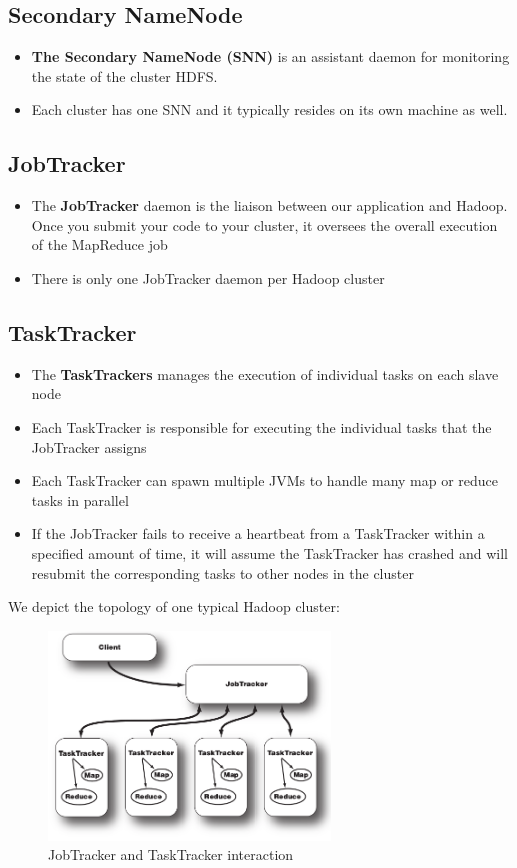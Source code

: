 \documentclass{article}
\begin{document}
\begin{multicols}{2}
\subsection {Secondary NameNode}
\begin{itemize}
\item \textbf{The Secondary NameNode (SNN)} is an assistant daemon for monitoring the state of the cluster HDFS. 
\item Each cluster has one SNN and it typically resides on its own machine as well.
\end{itemize}

\subsection {JobTracker}
\begin{itemize}
\item The \textbf{JobTracker} daemon is the liaison between our application and Hadoop. \\Once
you submit your code to your cluster, it oversees the overall execution of the MapReduce job
\item There is only one JobTracker daemon per Hadoop cluster
\end{itemize}

\subsection {TaskTracker}
\begin{itemize}
\item The \textbf{TaskTrackers} manages the execution of individual tasks on each slave node
\item Each TaskTracker is responsible for executing the individual tasks that the JobTracker assigns
\item Each TaskTracker can spawn multiple JVMs to handle many map or reduce tasks in parallel
\item If the JobTracker fails to receive a heartbeat from a TaskTracker within a specified amount of time, it will assume the TaskTracker has crashed and will resubmit the corresponding tasks to other nodes in the cluster\\
\end{itemize}

We depict the topology of one typical Hadoop cluster:
\begin{figure}[H]
\centering
\includegraphics[width=7.5cm]{assets/jobTrackers_taskTrakers_diagram.png}
\caption{JobTracker and TaskTracker interaction}
\label{fig:awesome_image}
\end{figure}


\end{multicols}
\end{document}
